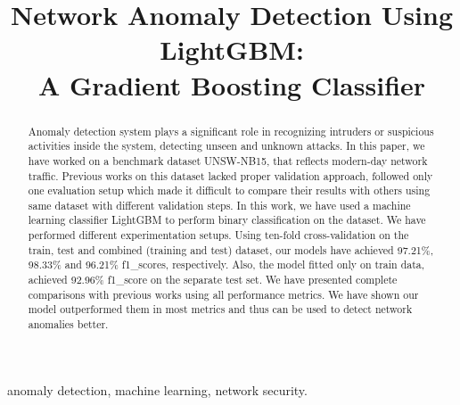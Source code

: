 \documentclass[14pt, conference]{IEEEtran}
\begin{document}
\title{Network Anomaly Detection Using LightGBM: \\ A Gradient Boosting Classifier}

\author{

}

\maketitle

\begin{abstract}
Anomaly detection system plays a significant role in recognizing intruders or suspicious activities inside the system, detecting unseen and unknown attacks. In this paper, we have worked on a benchmark dataset UNSW-NB15, that
reflects modern-day network traffic. Previous works on this dataset lacked proper validation approach, followed only one evaluation setup which made it difficult to compare their results with others using same dataset with different validation steps. In this work, we have used a machine learning classifier LightGBM to perform binary classification on the dataset. We have performed different experimentation setups. Using ten-fold cross-validation on the train,
test and combined (training and test) dataset, our models have achieved 97.21\%, 98.33\% and 96.21\% f1\_scores, respectively. Also, the
 model fitted only on train data, achieved 92.96\% f1\_score on the separate test set. We have presented complete comparisons with previous works using all performance metrics. We have shown our model outperformed them in most metrics and thus can be used to detect network anomalies better.
\end{abstract}

\begin{IEEEkeywords}
anomaly detection, machine learning,  network security.
\end{IEEEkeywords}
\end{document}
